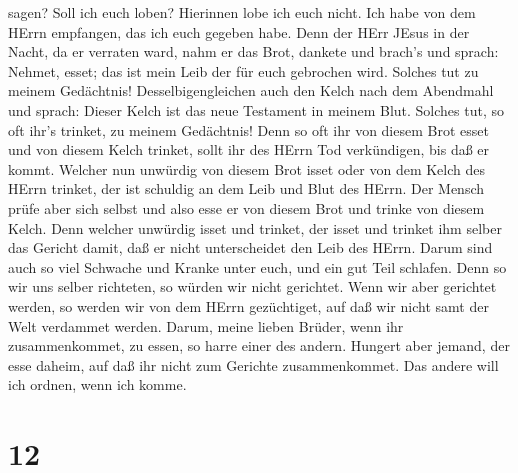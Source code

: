 sagen? Soll ich euch loben? Hierinnen lobe ich euch nicht. 
Ich habe von dem HErrn empfangen, das ich euch gegeben habe. Denn der
HErr JEsus in der Nacht, da er verraten ward, nahm er das Brot,
 dankete und brach's und sprach: Nehmet, esset; das ist
mein Leib der für euch gebrochen wird. Solches tut zu meinem Gedächtnis!
 Desselbigengleichen auch den Kelch nach dem Abendmahl und
sprach: Dieser Kelch ist das neue Testament in meinem Blut. Solches tut,
so oft ihr's trinket, zu meinem Gedächtnis!  Denn so oft
ihr von diesem Brot esset und von diesem Kelch trinket, sollt ihr des
HErrn Tod verkündigen, bis daß er kommt.  Welcher nun
unwürdig von diesem Brot isset oder von dem Kelch des HErrn trinket, der
ist schuldig an dem Leib und Blut des HErrn.  Der Mensch
prüfe aber sich selbst und also esse er von diesem Brot und trinke von
diesem Kelch.  Denn welcher unwürdig isset und trinket, der
isset und trinket ihm selber das Gericht damit, daß er nicht
unterscheidet den Leib des HErrn.  Darum sind auch so viel
Schwache und Kranke unter euch, und ein gut Teil schlafen. 
Denn so wir uns selber richteten, so würden wir nicht gerichtet.
 Wenn wir aber gerichtet werden, so werden wir von dem
HErrn gezüchtiget, auf daß wir nicht samt der Welt verdammet werden.
 Darum, meine lieben Brüder, wenn ihr zusammenkommet, zu
essen, so harre einer des andern.  Hungert aber jemand, der
esse daheim, auf daß ihr nicht zum Gerichte zusammenkommet. Das andere
will ich ordnen, wenn ich komme.

\hypertarget{section-11}{%
\section{12}\label{section-11}}

